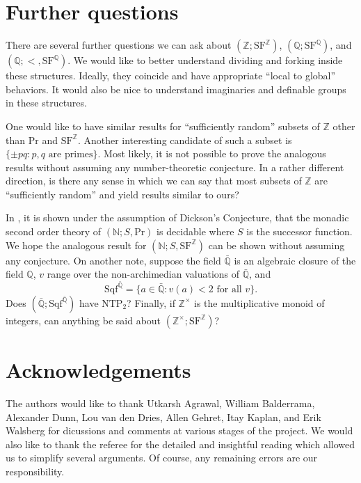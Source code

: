 \documentclass[letterpaper]{amsart}
\newcommand{\qq}{\mathbb{Q}}
\newcommand{\nn}{\mathbb{N}}
\newcommand{\zz}{\mathbb{Z}}
\newcommand{\SF}{\mathrm{SF}^\zz}
\newcommand{\SQ}{\mathrm{SF}^\qq}
\begin{document}
\section{Further questions}
\noindent There are several further questions we can ask about $(\zz; \SF)$, $(\qq; \SQ)$, and  $(\qq; <, \SQ)$. We would like to better understand dividing and forking inside these structures. Ideally, they coincide and have appropriate ``local to global'' behaviors. It would also be nice to understand imaginaries and definable groups in these structures.

One would like to have similar results for ``sufficiently random'' subsets of $\zz$ other than  $\text{Pr}$ and $\SF$. Another interesting candidate of such a subset is $\{\pm pq : p, q \text{ are primes}\}$. Most likely, it is not possible to prove the analogous results without assuming any number-theoretic conjecture. In a rather different direction, is there any sense in which we can say that most subsets of $\zz$ are ``sufficiently random'' and yield results similar to ours?

In \cite{BJW}, it is shown under the assumption of Dickson's Conjecture, that the monadic second order theory of $( \nn; S, \text{Pr})$ is decidable where $S$ is the successor function. We hope the analogous result for $( \nn; S, \SF)$ can be shown without assuming any conjecture. On another note, suppose the field  $\bar{\qq}$ is an algebraic closure of the field $\qq$, $v$ range over the non-archimedian valuations of $\bar{\qq}$, and $$ \text{Sqf}^{ \bar{\qq} } = \{ a \in \bar{\qq} :  v(a) <2 \text{ for all } v \}.$$
Does $( \bar{\qq}; \text{Sqf}^{ \bar{\qq} })$ have $\text{NTP}_2$? Finally, if $\zz^\times$ is the multiplicative monoid of integers, can anything be said about $(\zz^\times; \SF)$? 

\section*{Acknowledgements}
\noindent The authors would like to thank  Utkarsh Agrawal, William Balderrama, Alexander Dunn,  Lou van den Dries, Allen Gehret, Itay Kaplan, and Erik Walsberg  for dicussions and comments  at various stages of the project. We would also like to thank the referee for the detailed and insightful reading which allowed us to simplify several arguments. Of course, any remaining errors are our responsibility.


\end{document}
